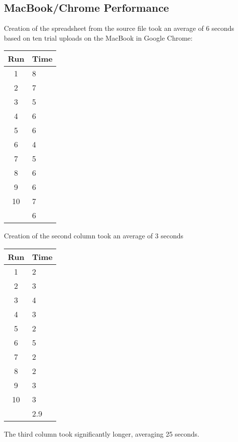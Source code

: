 

\subsection{MacBook/Chrome Performance}

Creation of the spreadsheet from the source file took an average of 6 seconds
based on ten trial uploads on the MacBook in Google Chrome:

\begin{tabular}{| c | l |}
  \hline
  Run  & Time \\ \hline
  1    & 8    \\ \hline
  2    & 7    \\ \hline
  3    & 5    \\ \hline
  4    & 6    \\ \hline
  5    & 6    \\ \hline
  6    & 4    \\ \hline
  7    & 5    \\ \hline
  8    & 6    \\ \hline
  9    & 6    \\ \hline
  10   & 7    \\ \hline
       & 6    \\
  \hline
\end{tabular}

Creation of the second column took an average of 3 seconds

\begin{tabular}{| c | l |}
  \hline
  Run  & Time \\ \hline
  1    & 2    \\ \hline
  2    & 3    \\ \hline
  3    & 4    \\ \hline
  4    & 3    \\ \hline
  5    & 2    \\ \hline
  6    & 5    \\ \hline
  7    & 2    \\ \hline
  8    & 2    \\ \hline
  9    & 3    \\ \hline
  10   & 3    \\ \hline
       & 2.9  \\
  \hline
\end{tabular}

The third column took significantly longer, averaging 25 seconds.

